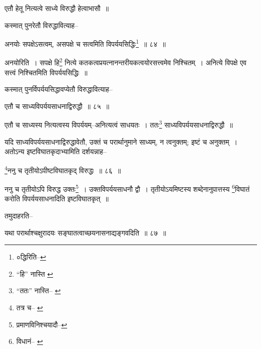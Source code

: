 \documentclass[article,12pt,a4paper]{memoir}
\begin{document}
	  \pstart एतौ हेतू नित्यत्वे साध्ये विरुद्धौ हेत्वाभासौ ॥
	\pend
       

	  \pstart कस्मात् पुनरेतौ विरुद्धावित्याह--
	\pend
       
	  \bigskip
	  \begingroup
	

	  \pstart अनयोः सपक्षेऽसत्वम्, असपक्षे च सत्वमिति विपर्ययसिद्धिः\footnote{०द्धिरिति--\cite{dp-msC}} ॥ ८४ ॥
	\pend
      
	  \endgroup
	 

	  \pstart अनयोरिति । सपक्षे हि\footnote{“हि” नास्ति \cite{dp-msA} \cite{dp-msB} \cite{dp-edP} \cite{dp-edH} \cite{dp-edE} \cite{dp-edN}} नित्ये कतकत्वप्रयत्नानन्तरीयकत्वयोरसत्त्वमेव निश्चितम् । अनित्ये विपक्षे एव सत्त्वं निश्चितमिति विपर्ययसिद्धिः ॥
	\pend
       

	  \pstart कस्मात् पुनर्विपर्ययसिद्धावप्येतौ विरुद्धावित्याह--
	\pend
       
	  \bigskip
	  \begingroup
	

	  \pstart एतौ च साध्यविपर्ययसाधनाद्विरुद्धौ ॥ ८५ ॥
	\pend
      
	  \endgroup
	 

	  \pstart एतौ च साध्यस्य नित्यत्वस्य विपर्ययम्--अनित्यत्वं साधयतः । ततः\footnote{“ततः” नास्ति--\cite{dp-msA} \cite{dp-msB} \cite{dp-edP} \cite{dp-edH} \cite{dp-edN}} साध्यविपर्ययसाधनाद्विरुद्धौ ॥
	\pend
       

	  \pstart यदि साध्यविपर्ययसाधनाद्विरुद्धावेतौ, उक्तं च परार्थानुमाने साध्यम्, न त्वनुक्तम्; इष्टं च अनुक्तम् । अतोऽन्य इष्टविघातकृदाभ्यामिति दर्शयन्नाह--
	\pend
       
	  \bigskip
	  \begingroup
	

	  \pstart \footnote{तत्र च--\cite{dp-msB} \cite{dp-edP} \cite{dp-edH}}\-ननु च तृतीयोऽपीष्टविघातकृद् विरुद्धः ॥ ८६ ॥
	\pend
      
	  \endgroup
	 

	  \pstart ननु च तृतीयोऽपि विरुद्ध उक्तः\footnote{प्रमाणविनिश्चयादौ--\cite{dp-msD-n}} । उक्तविपर्ययसाधनौ द्वौ । तृतीयोऽयमिष्टस्य शब्देनानुपात्तस्य \footnote{विधानं--\cite{dp-msA} \cite{dp-msB} \cite{dp-edP} \cite{dp-edH}}\-विघातं करोति विपर्ययसाधनादिति इष्टविघातकृत् ॥
	\pend
       

	  \pstart तमुदाहरति--
	\pend
      
	  \endgroup
	
	  \bigskip
	  \begingroup
	

	  \pstart यथा परार्थाश्चक्षुरादयः सङ्घातत्वाच्छयनासनाद्यङ्गवदिति ॥ ८७ ॥
	\pend
      
	  \endgroup
	
\end{document}

